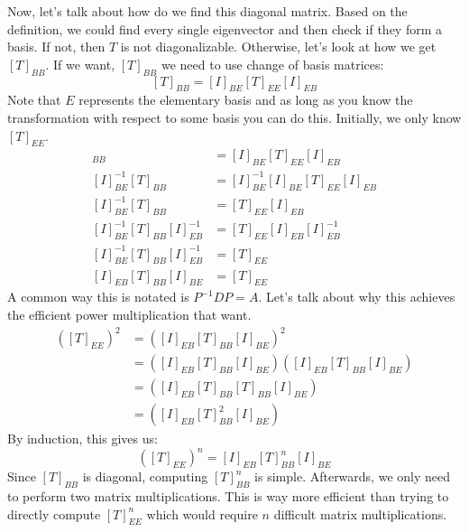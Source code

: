 Now, let's talk about how do we find this diagonal matrix. Based on the definition, we could find every single eigenvector and then check if they form a basis. If not, then $T$ is not diagonalizable. Otherwise, let's look at how we get $[T]_{BB}$. If we want, $[T]_{BB}$ we need to use change of basis matrices:
$$[T]_{BB}=[I]_{BE}[T]_{EE}[I]_{EB}$$
Note that $E$ represents the elementary basis and as long as you know the transformation with respect to some basis you can do this. Initially, we only know $[T]_{EE}$.
\begin{align*}
    [T]_{BB}&=[I]_{BE}[T]_{EE}[I]_{EB}\\
    [I]_{BE}^{-1}[T]_{BB}&=[I]_{BE}^{-1}[I]_{BE}[T]_{EE}[I]_{EB}\\
    [I]_{BE}^{-1}[T]_{BB}&=[T]_{EE}[I]_{EB}\\
    [I]_{BE}^{-1}[T]_{BB}[I]_{EB}^{-1}&=[T]_{EE}[I]_{EB}[I]_{EB}^{-1}\\
    [I]_{BE}^{-1}[T]_{BB}[I]_{EB}^{-1}&=[T]_{EE}\\
    [I]_{EB}[T]_{BB}[I]_{BE}&=[T]_{EE}
\end{align*}
A common way this is notated is $P^{-1}DP=A$. Let's talk about why this achieves the efficient power multiplication that want.
\begin{align*}
    ([T]_{EE})^2&=([I]_{EB}[T]_{BB}[I]_{BE})^2\\
    &=([I]_{EB}[T]_{BB}[I]_{BE})([I]_{EB}[T]_{BB}[I]_{BE})\\
    &=([I]_{EB}[T]_{BB}[T]_{BB}[I]_{BE})\\
    &=([I]_{EB}[T]_{BB}^2[I]_{BE})
\end{align*}
By induction, this gives us:
$$([T]_{EE})^n=[I]_{EB}[T]_{BB}^n[I]_{BE}$$
Since $[T]_{BB}$ is diagonal, computing $[T]_{BB}^n$ is simple. Afterwards, we only need to perform two matrix multiplications. This is way more efficient than trying to directly compute $[T]_{EE}^n$ which would require $n$ difficult matrix multiplications.